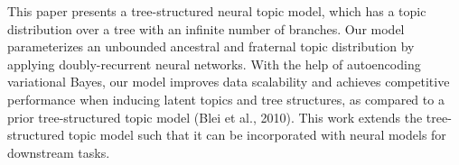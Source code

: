 This paper presents a tree-structured neural topic model, which has a topic distribution over a tree with an infinite number of branches. Our model parameterizes an unbounded ancestral and fraternal topic distribution by applying doubly-recurrent neural networks. With the help of autoencoding variational Bayes, our model improves data scalability and achieves competitive performance when inducing latent topics and tree structures, as compared to a prior tree-structured topic model (Blei et al., 2010). This work extends the tree-structured topic model such that it can be incorporated with neural models for downstream tasks.
